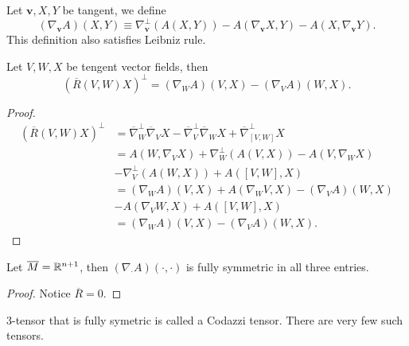 Let $\mathbf{v},X,Y$ be tangent, we define
\begin{equation}
  \left( \nabla _{\mathbf{v}}A \right) (X,Y)\equiv \nabla _{\mathbf{v}}^{\perp}\left( A(X,Y) \right) -A\left( \nabla _{\mathbf{v}}X,Y \right) -A\left( X,\nabla _{\mathbf{v}}Y \right). 
\end{equation}
This definition also satisfies Leibniz rule.

\begin{theorem}
  Let $V,W,X$ be tengent vector fields, then 
  \begin{equation}
    \left( \overline{R}(V,W)X \right) ^\perp=\left( \nabla _W A \right) (V,X)-(\nabla _{V}A)(W,X).
  \end{equation}
\end{theorem}
\begin{proof}
  \begin{align*}
    \left( \overline{R}(V,W)X \right) ^{\perp} &= \overline{\nabla}^{\perp}_W \overline{\nabla }_{V}X-\overline{\nabla }^{\perp}_{V} \overline{\nabla }_{W}X+\overline{\nabla }^{\perp}_{[V,W]}X\\
    &= A(W,\nabla _VX)+\nabla^{\perp}_{W}\left( A(V,X) \right) -A\left( V,\nabla _{W}X \right) \\
    &-\nabla_{V}^{\perp}\left( A(W,X) \right) +A\left( [V,W],X \right)\\
    &= \left( \nabla _{W}A \right) (V,X)+A\left( \nabla _W V,X \right) -\left( \nabla _{V}A \right) (W,X)\\
    &- A\left( \nabla _VW,X \right) +A\left( [V,W],X \right) \\
    &=\left( \nabla _W A \right) (V,X)-\left( \nabla _VA \right) (W,X)
  .\end{align*}
\end{proof}
\begin{corollary}
  Let $\overline{M}=\mathbb{R}^{n+1}$, then $(\nabla_{\cdot }A)(\cdot ,\cdot ) $ is fully symmetric in all three entries.
\end{corollary}
\begin{proof}
  Notice $\overline{R}=0$.
\end{proof}
\begin{remark}
  $3$-tensor that is fully symetric is called a Codazzi tensor. There are very few such tensors.
\end{remark}

